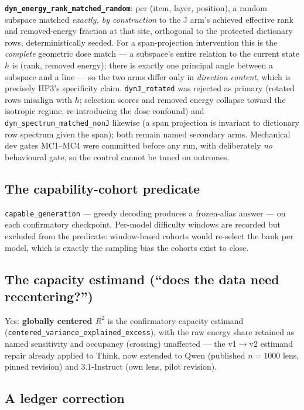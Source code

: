 \documentclass[10pt]{article}
\newcommand{\code}[1]{\texttt{\small #1}}
\begin{document}
\textbf{\code{dyn\_energy\_rank\_matched\_random}}: per (item, layer,
position), a random subspace matched \emph{exactly, by construction} to
the J arm's achieved effective rank and removed-energy fraction at that
site, orthogonal to the protected dictionary rows, deterministically
seeded. For a span-projection intervention this is the \emph{complete}
geometric dose match --- a subspace's entire relation to the current
state $h$ is (rank, removed energy); there is exactly one principal
angle between a subspace and a line --- so the two arms differ only in
\emph{direction content}, which is precisely HP3's specificity claim.
\code{dynJ\_rotated} was rejected as primary (rotated rows misalign with
$h$; selection scores and removed energy collapse toward the isotropic
regime, re-introducing the dose confound) and
\code{dyn\_spectrum\_matched\_nonJ} likewise (a span projection is
invariant to dictionary row spectrum given the span); both remain named
secondary arms. Mechanical dev gates MC1--MC4 were committed before any
run, with deliberately \emph{no} behavioural gate, so the control cannot
be tuned on outcomes.

\subsection{The capability-cohort predicate}

\code{capable\_generation} --- greedy decoding produces a frozen-alias
answer --- on each confirmatory checkpoint. Per-model difficulty windows
are recorded but excluded from the predicate: window-based cohorts would
re-select the bank per model, which is exactly the sampling bias the
cohorts exist to close.

\subsection{The capacity estimand (``does the data need recentering?'')}

Yes: \textbf{globally centered $R^2$} is the confirmatory capacity
estimand (\code{centered\_variance\_explained\_excess}), with the raw
energy share retained as named sensitivity and occupancy (crossing)
unaffected --- the v1$\to$v2 estimand repair already applied to Think,
now extended to Qwen (published $n{=}1000$ lens, pinned revision) and
3.1-Instruct (own lens, pilot revision).

\subsection{A ledger correction}
\end{document}
